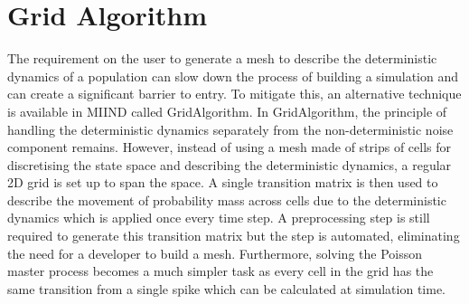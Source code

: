 \documentclass[utf8]{frontiersSCNS} %
\begin{document}
\section{Grid Algorithm}
\label{gridalgorithm}
The requirement on the user to generate a mesh to describe the deterministic dynamics of a population can slow down the process of building a simulation and can create a significant barrier to entry. To mitigate this, an alternative technique is available in MIIND called GridAlgorithm. In GridAlgorithm, the principle of handling the deterministic dynamics separately from the non-deterministic noise component remains. However, instead of using a mesh made of strips of cells for discretising the state space and describing the deterministic dynamics, a regular 2D grid is set up to span the space. A single transition matrix is then used to describe the movement of probability mass across cells due to the deterministic dynamics which is applied once every time step. A preprocessing step is still required to generate this transition matrix but the step is automated, eliminating the need for a developer to build a mesh. Furthermore, solving the Poisson master process becomes a much simpler task as every cell in the grid has the same transition from a single spike which can be calculated at simulation time.\\ 
\end{document}
